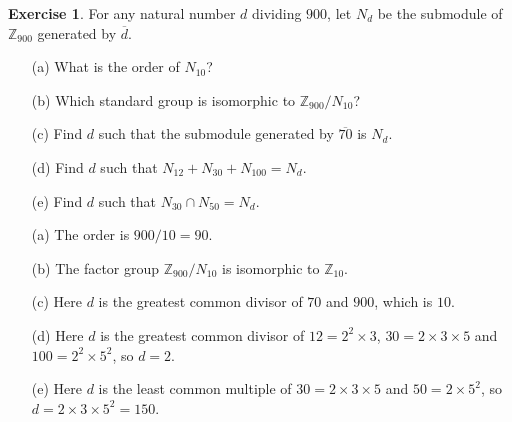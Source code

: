 \documentclass{amsart}
\newcommand{\Z}         {{\mathbb{Z}}}
\newcommand{\ov}[1]     {\overline{#1}}
\newcommand{\tm}        {\times}
\newcommand{\ip}[1]     {\langle #1\rangle}
\renewcommand{\:}{\colon}
\theoremstyle{definition}
\newtheorem{exercise}{Exercise}[section]
\renewenvironment{solution}{\SolutionAtEnd}{\endSolutionAtEnd}
\begin{document}
\begin{exercise}
 For any natural number $d$ dividing $900$, let $N_d$ be the submodule
 of $\Z_{900}$ generated by $\ov{d}$.
 \begin{itemize}
  \item[(a)] What is the order of $N_{10}$?
  \item[(b)] Which standard group is isomorphic to $\Z_{900}/N_{10}$?
  \item[(c)] Find $d$ such that the submodule generated by $\ov{70}$ is
   $N_d$.
  \item[(d)] Find $d$ such that $N_{12}+N_{30}+N_{100}=N_d$.
  \item[(e)] Find $d$ such that $N_{30}\cap N_{50}=N_d$. 
 \end{itemize}
\end{exercise}
\begin{solution}
 \begin{itemize}
  \item[(a)] The order is $900/10=90$.
  \item[(b)] The factor group $\Z_{900}/N_{10}$ is isomorphic to
   $\Z_{10}$.
  \item[(c)] Here $d$ is the greatest common divisor of $70$ and
   $900$, which is $10$.
  \item[(d)] Here $d$ is the greatest common divisor of $12=2^2\tm 3$,
   $30=2\tm 3\tm 5$ and $100=2^2\tm 5^2$, so $d=2$.
  \item[(e)] Here $d$ is the least common multiple of $30=2\tm 3\tm 5$
   and $50=2\tm 5^2$, so $d=2\tm 3\tm 5^2=150$.
 \end{itemize}
\end{solution}
\end{document}
